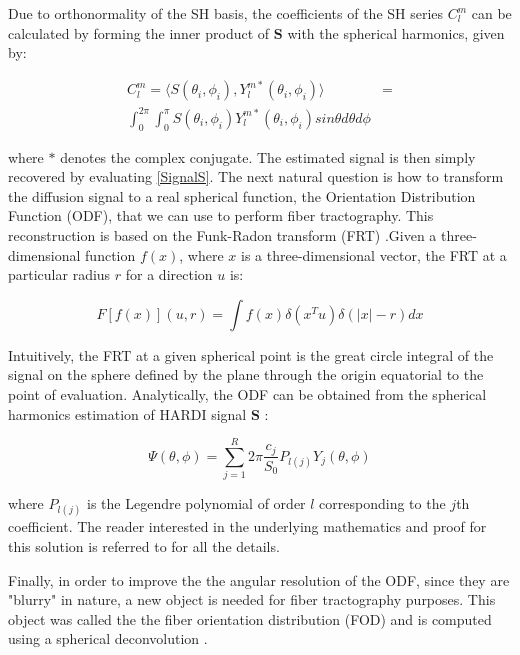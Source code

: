 \documentclass{cys}
\begin{document}
Due to orthonormality of the SH basis, the coefficients of the SH series $C_l^m$ can be calculated by forming the inner product of $\mathbf{S}$ with the spherical harmonics, given by:

\begin{equation}
\begin{split}
C_l^m = \langle S(\theta_i,\phi_i),Y_l^{m\ast}(\theta_i,\phi_i) \rangle &= \\ \int_0^{2\pi} \int_0^\pi S(\theta_i,\phi_i)Y_l^{m\ast}(\theta_i,\phi_i) sin \theta d\theta d\phi
\end{split}
\end{equation}

where $\ast$ denotes  the  complex conjugate. The estimated signal is then simply recovered by evaluating \ref{SignalS}. The next natural question is how to transform the diffusion signal to a real spherical function, the Orientation Distribution Function (ODF), that we can use to perform fiber tractography. This reconstruction is based on the Funk-Radon transform (FRT) \cite{funk1915geometrische}.Given a three-dimensional function $f(x)$, where $x$ is a three-dimensional vector, the FRT at a particular radius $r$ for a direction $u$ is:

\begin{equation}
F[f(x)](u,r)=\int f(x)\delta(x^T u)\delta(|x|-r)dx
\end{equation} 

Intuitively, the FRT at a given spherical point is the great circle integral of the signal on the sphere defined by the plane through the origin equatorial to the point of evaluation. Analytically, the ODF can be obtained from the spherical harmonics estimation of HARDI signal $\mathbf{S}$ \cite{descoteaux2007regularized, hess2006q, anderson2005measurement}:


\begin{equation}
\Psi(\theta,\phi)=\sum_{j=1}^R 2\pi\frac{c_j}{S_0}P_{l(j)}Y_j(\theta,\phi)
\end{equation}

where $P_{l(j)}$ is the Legendre polynomial of order $l$ corresponding to the $j$th coefficient. The reader interested in the underlying mathematics and proof for this solution is referred to \cite{descoteaux2008high} for all the details. 

\bigskip
Finally, in order to improve the the angular resolution of the ODF, since they are "blurry" in nature, a new object is needed for fiber tractography purposes. This object was called the the fiber orientation distribution (FOD) and is computed using a spherical deconvolution \cite{tournier2004direct}.  
\end{document}
